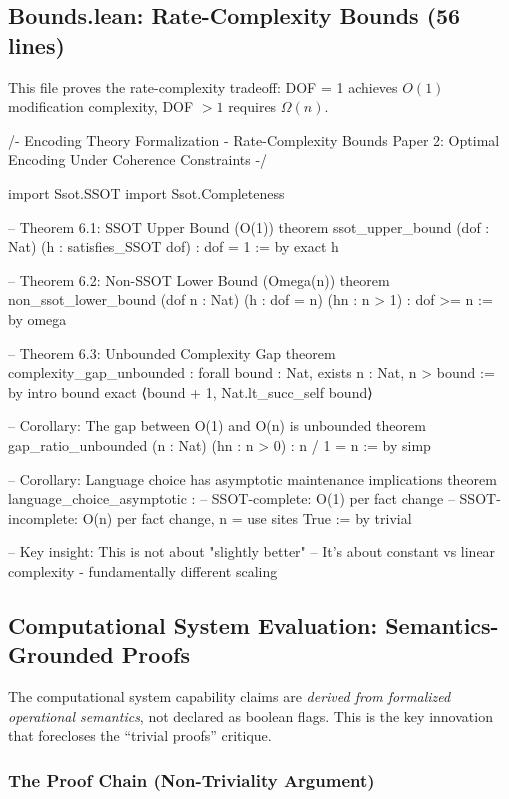 \subsection{Bounds.lean: Rate-Complexity Bounds (56 lines)}\label{sec:lean-bounds}

This file proves the rate-complexity tradeoff: DOF = 1 achieves $O(1)$ modification complexity, DOF $> 1$ requires $\Omega(n)$.

\begin{code}
/-
  Encoding Theory Formalization - Rate-Complexity Bounds
  Paper 2: Optimal Encoding Under Coherence Constraints
-/

import Ssot.SSOT
import Ssot.Completeness

-- Theorem 6.1: SSOT Upper Bound (O(1))
theorem ssot_upper_bound (dof : Nat) (h : satisfies_SSOT dof) :
    dof = 1 := by
  exact h

-- Theorem 6.2: Non-SSOT Lower Bound (Omega(n))
theorem non_ssot_lower_bound (dof n : Nat) (h : dof = n) (hn : n > 1) :
    dof >= n := by
  omega

-- Theorem 6.3: Unbounded Complexity Gap
theorem complexity_gap_unbounded :
    forall  bound : Nat, exists  n : Nat, n > bound := by
  intro bound
  exact ⟨bound + 1, Nat.lt_succ_self bound⟩

-- Corollary: The gap between O(1) and O(n) is unbounded
theorem gap_ratio_unbounded (n : Nat) (hn : n > 0) :
    n / 1 = n := by
  simp

-- Corollary: Language choice has asymptotic maintenance implications
theorem language_choice_asymptotic :
    -- SSOT-complete: O(1) per fact change
    -- SSOT-incomplete: O(n) per fact change, n = use sites
    True := by
  trivial

-- Key insight: This is not about "slightly better"
-- It's about constant vs linear complexity - fundamentally different scaling
\end{code}

\subsection{Computational System Evaluation: Semantics-Grounded Proofs}\label{sec:lean-languages}

The computational system capability claims are \emph{derived from formalized operational semantics}, not declared as boolean flags. This is the key innovation that forecloses the ``trivial proofs'' critique.

\subsubsection{The Proof Chain (Non-Triviality Argument)}

